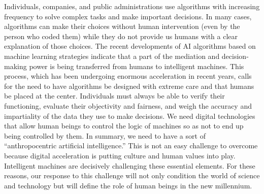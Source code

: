 Individuals, companies, and public administrations use algorithms with increasing frequency to solve complex tasks and make important decisions. In many cases, algorithms can make their choices without human intervention (even by the person who coded them) while they do not provide us humans with a clear explanation of those choices. The recent developments of AI algorithms based on machine learning strategies indicate that a part of the mediation and decision-making power is being transferred from humans to intelligent machines. This process, which has been undergoing enormous acceleration in recent years, calls for the need to have algorithms be designed with extreme care and that humans be placed at the center. Individuals must always be able to verify their functioning, evaluate their objectivity and fairness, and weigh the accuracy and impartiality of the data they use to make decisions. We need digital technologies that allow human beings to control the logic of machines so as not to end up being controlled by them. In summary, we need to have a sort of ``anthropocentric artificial \hbox{intelligence.''} This is not an easy challenge to overcome because digital acceleration is putting culture and human values into play. Intelligent machines are decisively challenging these essential elements. For these reasons, our response to this challenge will not only condition the world of science and technology but will define the role of human beings in the new millennium.

